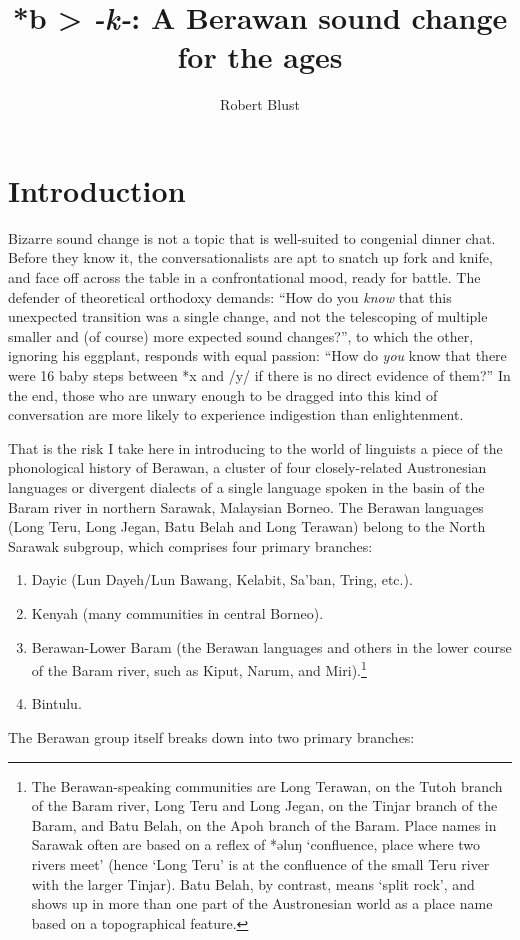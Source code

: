 \documentclass[output=paper]{langscibook}
\author{Robert Blust\orcid{}\affiliation{University of Hawaiʻi, Mānoa}}
\title{*b > \textit{-k-}: A Berawan sound change for the ages}
\begin{document}
\maketitle 



\section{Introduction}\label{sec:Blust-Introduction}
Bizarre sound change is not a topic that is well-suited to congenial dinner chat. Before they know it, the conversationalists are apt to snatch up fork and knife, and face off across the table in a confrontational mood, ready for battle. The defender of theoretical orthodoxy demands: “How do you \emph{know} that this unexpected transition was a single change, and not the telescoping of multiple smaller and (of course) more expected sound changes?”, to which the other, ignoring his eggplant, responds with equal passion: “How do \emph{you} know that there were 16 baby steps between *x and /y/ if there is no direct evidence of them?” In the end, those who are unwary enough to be dragged into this kind of conversation are more likely to experience indigestion than enlightenment.

That is the risk I take here in introducing to the world of linguists a piece of the phonological history of Berawan, a cluster of four closely-related Austronesian languages or divergent dialects of a single language spoken in the basin of the Baram river in northern Sarawak, Malaysian Borneo. The Berawan languages (Long Teru, Long Jegan, Batu Belah and Long Terawan) belong to the North Sarawak subgroup, which comprises four primary branches: 

\begin{enumerate}
\item Dayic (Lun Dayeh/Lun Bawang, Kelabit, Sa’ban, Tring, etc.).
\item Kenyah (many communities in central Borneo).
\item Berawan-Lower Baram (the Berawan languages and others in the lower course of the Baram river, such as Kiput, Narum, and Miri).\footnote{The Berawan-speaking communities are Long Terawan, on the Tutoh branch of the Baram river, Long Teru and Long Jegan, on the Tinjar branch of the Baram, and Batu Belah, on the Apoh branch of the Baram. Place names in Sarawak often are based on a reflex of *əluŋ ‘confluence, place where two rivers meet’ (hence ‘Long Teru’ is at the confluence of the small Teru river with the larger Tinjar). Batu Belah, by contrast, means ‘split rock’, and shows up in more than one part of the Austronesian world as a place name based on a topographical feature.}
\item Bintulu.
\end{enumerate}
The Berawan group itself breaks down into two primary branches:
\end{document}
